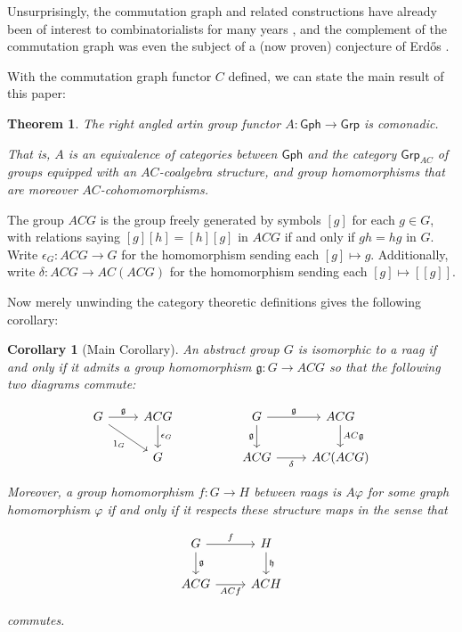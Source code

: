 \documentclass[12pt]{article}
\newtheorem*{thm*}{Theorem}
\newtheorem*{cor*}{Corollary}
\theoremstyle{definition}
\theoremstyle{theorem}
\newcommand{\Gph}{\mathsf{Gph}}
\begin{document}
  Unsurprisingly, the commutation graph and related constructions have already 
  been of interest to combinatorialists for many years 
  \cite{baumeisterCommutingGraphsOdd2009,
  dolinarMaximalDistancesCommuting2012,
  giudiciDiametersCommutingGraphs2010,
  arvindRecognizingCommutingGraph2022,
  cameronGraphsDefinedGroups2022}, and the complement of the commutation 
  graph was even the subject of a (now proven) conjecture of Erd\H{o}s
  \cite{neumannProblemPaulErdos1976}.

  With the commutation graph functor $C$ defined, we can state the main result
  of this paper:

  \begin{thm*}
    The right angled artin group functor $A : \mathsf{Gph} \to \mathsf{Grp}$ is comonadic. 

    That is, $A$ is an equivalence of categories between $\Gph$ and 
    the category $\mathsf{Grp}_{AC}$ of groups equipped with an $AC$-coalgebra structure,
    and group homomorphisms that are moreover $AC$-cohomomorphisms. 
  \end{thm*}

  The group $ACG$ is the group freely generated by symbols $[g]$ for each $g \in G$, 
  with relations saying $[g][h] = [h][g]$ in $ACG$ if and only if $gh = hg$ in $G$. 
  Write $\epsilon_G : ACG \to G$ for the homomorphism sending each $[g] \mapsto g$.
  Additionally, write $\delta : ACG \to AC(ACG)$ for the homomorphism sending each
  $[g] \mapsto [[g]]$.

  Now merely unwinding the category theoretic definitions gives the following corollary:


  \begin{cor*}[Main Corollary]
    An abstract group $G$ is isomorphic to a raag if and only if it admits a 
    group homomorphism $\mathfrak{g} : G \to ACG$ so that the following two 
    diagrams commute:

    \[
        \begin{tikzcd}
        G & ACG && G   & ACG \\
          & G   && ACG & AC(ACG)
        \arrow["\mathfrak{g}", from=1-1, to=1-2]
        \arrow["{\epsilon_G}", from=1-2, to=2-2]
        \arrow["{1_G}"', from=1-1, to=2-2]
        \arrow["\mathfrak{g}"', from=1-4, to=2-4]
        \arrow["\mathfrak{g}", from=1-4, to=1-5]
        \arrow["\delta"', from=2-4, to=2-5]
        \arrow["AC\mathfrak{g}", from=1-5, to=2-5]
        \end{tikzcd}
    \]

    Moreover, a group homomorphism $f : G \to H$ between raags is 
    $A \varphi$ for some graph homomorphism $\varphi$ if and only if it 
    respects these structure maps in the sense that 

    \[
        \begin{tikzcd}
        G & H \\
        ACG & ACH
        \arrow["\mathfrak{g}", from=1-1, to=2-1]
        \arrow["\mathfrak{h}", from=1-2, to=2-2]
        \arrow["f", from=1-1, to=1-2]
        \arrow["ACf"', from=2-1, to=2-2]
        \end{tikzcd}
    \]    

    commutes.
  \end{cor*}
\end{document}
